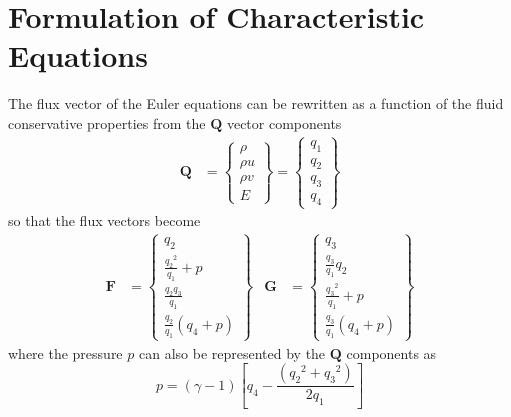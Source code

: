 \section{Formulation of Characteristic Equations}
The flux vector of the Euler equations can be rewritten as a function of the fluid conservative properties from the $\textbf{Q}$ vector components
%
\begin{align}
    \label{eq:euler_sol_vec}
    \textbf{Q} &= \left\{ \begin{array}{c} \rho \\ \rho u \\ \rho v \\ E
    \end{array} \right\} = \left\{ \begin{array}{c} q_1 \\ q_2 \\ q_3 \\ q_4
    \end{array} \right\}
\end{align}    
%
so that the flux vectors become
%
\begin{align}
    \label{eq:euler_flx_vec}
    \textbf{F} &= \left\{ \begin{array}{c} 
    	q_2 \\ 
	    \frac{{q_2}^{2}}{q_1} + p \\
	    \frac{q_2 q_3}{q_1} \\
	    \frac{q_2}{q_1}\left( q_4 + p \right)
    \end{array} \right\} &
    \textbf{G} &= \left\{ \begin{array}{c} 
    	q_3 \\ 
    	\frac{q_3}{q_1} q_2 \\
    	\frac{{q_3}^{2}}{q_1} + p \\    	 
    	\frac{q_3}{q_1}\left( q_4 + p \right)
    \end{array} \right\}    
\end{align}
%
where the pressure $p$ can also be represented by the $\textbf{Q}$ components as
%
\begin{equation}
    \label{eq:eq_pressure}
    p = (\gamma-1)\left[ q_4 - \frac{({q_2}^2 + {q_3}^2)}{2 q_1} \right]
\end{equation}
%

